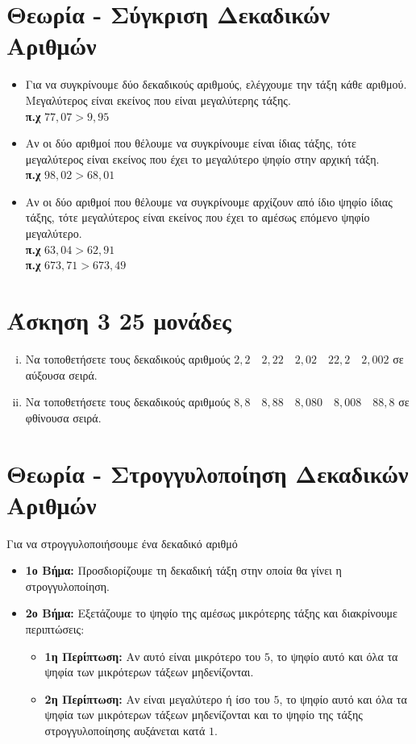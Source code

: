 \documentclass[a4paper,10pt]{report}
\begin{document}
\section*{Θεωρία - Σύγκριση Δεκαδικών Αριθμών\hfill \small{}}
\begin{itemize}
 \item Για να συγκρίνουμε δύο δεκαδικούς αριθμούς, ελέγχουμε την τάξη κάθε αριθμού. Μεγαλύτερος είναι 
       εκείνος που είναι μεγαλύτερης τάξης.\\
      \textbf{π.χ} $77,07 > 9,95$
 \item Αν οι δύο αριθμοί που θέλουμε να συγκρίνουμε είναι ίδιας τάξης, τότε μεγαλύτερος είναι εκείνος 
       που έχει το μεγαλύτερο ψηφίο στην αρχική τάξη.\\
       \textbf{π.χ} $98,02 > 68,01$
 \item Αν οι δύο αριθμοί που θέλουμε να συγκρίνουμε αρχίζουν από ίδιο ψηφίο ίδιας τάξης, τότε μεγαλύτερος 
       είναι εκείνος που έχει το αμέσως επόμενο ψηφίο μεγαλύτερο.\\
      \textbf{π.χ} $63,04 > 62,91$\\
      \textbf{π.χ} $673,71 > 673,49$
\end{itemize}



\section*{Άσκηση 3  \hfill \small{25 μονάδες}}
\begin{enumerate}[i)]
 \item Να τοποθετήσετε τους δεκαδικούς αριθμούς $2,2 \quad 2,22 \quad 2,02 \quad 22,2 \quad 2,002$
       σε αύξουσα σειρά.
 \item Να τοποθετήσετε τους δεκαδικούς αριθμούς $8,8 \quad 8,88 \quad 8,080 \quad 8,008 \quad 88,8$
       σε φθίνουσα σειρά.
\end{enumerate}


\section*{Θεωρία - Στρογγυλοποίηση Δεκαδικών Αριθμών\hfill \small{}}
Για να στρογγυλοποιήσουμε ένα δεκαδικό αριθμό
\begin{itemize}
 \item \textbf{1ο Βήμα:} Προσδιορίζουμε τη δεκαδική τάξη στην οποία θα γίνει η στρογγυλοποίηση.
 \item \textbf{2ο Βήμα:} Εξετάζουμε το ψηφίο της αμέσως μικρότερης τάξης και διακρίνουμε περιπτώσεις: 
        \begin{itemize}
         \item \textbf{1η Περίπτωση:} Αν αυτό είναι μικρότερο του $5$, το ψηφίο αυτό και όλα τα ψηφία 
                των μικρότερων τάξεων μηδενίζονται.
         \item \textbf{2η Περίπτωση:} Αν είναι μεγαλύτερο ή ίσο του $5$, το ψηφίο αυτό και όλα τα ψηφία 
                των μικρότερων τάξεων μηδενίζονται και το ψηφίο της τάξης στρογγυλοποίησης αυξάνεται κατά $1$.
        \end{itemize}
\end{itemize}
\end{document}
